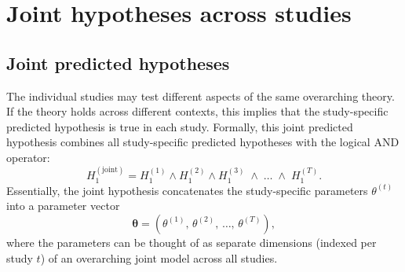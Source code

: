 \documentclass[letterpaper,11pt,oneside]{article}
\begin{document}

\section{Joint hypotheses across studies}

\subsection{Joint predicted hypotheses}
\label{sec:joint-predicted}

The individual studies may test different aspects of the same overarching theory. If the theory holds across different contexts, this implies that the study-specific predicted hypothesis is true in each study. Formally, this joint predicted hypothesis combines all study-specific predicted hypotheses with the logical AND operator:
    \[
    H_1^{(\text{joint})} = H_1^{(1)} \land H_1^{(2)} \land H_1^{(3)} \;\land\; \dots \;\land\; H_1^{(T)}.
    \]
Essentially, the joint hypothesis concatenates the study-specific parameters $\theta^{(t)}$ into a parameter vector
    \[
    \boldsymbol{\theta} = \left(\theta^{(1)}, \, \theta^{(2)}, \, \dots, \, \theta^{(T)}\right),
    \]
where the parameters can be thought of as separate dimensions (indexed per study $t$) of an overarching joint model across all studies.
\end{document}
